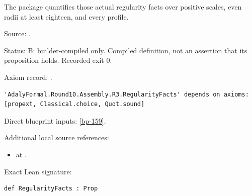 \begin{definition}[bp-160]
\label{bp-160}
\leanok
The package quantifies those actual regularity facts over positive scales, even radii at least eighteen, and every profile.

\par Source: \texttt{}.
\par Status: B: builder-compiled only. Compiled definition, not an assertion that its proposition holds. Recorded exit 0.
\par Axiom record: \texttt{}.
\begin{verbatim}
'AdalyFormal.Round10.Assembly.R3.RegularityFacts' depends on axioms: [propext, Classical.choice, Quot.sound]
\end{verbatim}
\par Direct blueprint inputs: \ref{bp-159}.
\par Additional local source references:
\begin{itemize}
\item \texttt{} at \texttt{}.
\end{itemize}
\par Exact Lean signature:
\begin{verbatim}
def RegularityFacts : Prop
\end{verbatim}
\end{definition}

